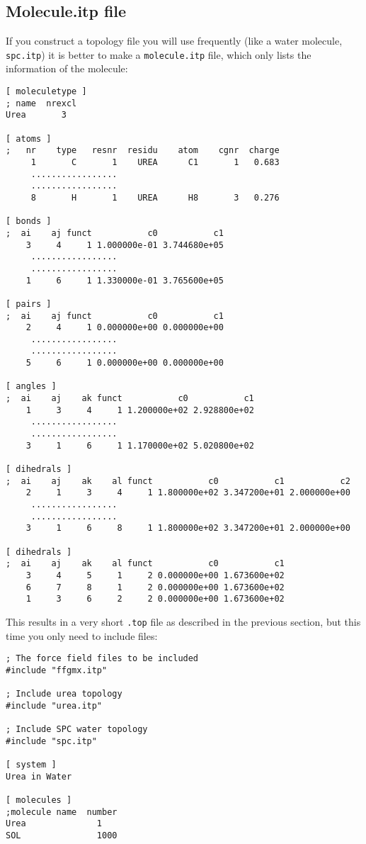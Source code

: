 \subsection{Molecule.itp file}
\label{subsec:molitp}
If you construct a topology file you will use frequently (like a water
molecule, {\tt spc.itp}) it is better to make a {\tt molecule.itp}
file, which only lists the information of the molecule: 
{\small\begin{verbatim}
[ moleculetype ]
; name  nrexcl
Urea       3

[ atoms ]
;   nr    type   resnr  residu    atom    cgnr  charge
     1       C       1    UREA      C1       1   0.683  
     .................
     .................
     8       H       1    UREA      H8       3   0.276

[ bonds ]
;  ai    aj funct           c0           c1
    3     4     1 1.000000e-01 3.744680e+05 
     .................
     .................
    1     6     1 1.330000e-01 3.765600e+05 

[ pairs ]
;  ai    aj funct           c0           c1
    2     4     1 0.000000e+00 0.000000e+00 
     .................
     .................
    5     6     1 0.000000e+00 0.000000e+00 

[ angles ]
;  ai    aj    ak funct           c0           c1
    1     3     4     1 1.200000e+02 2.928800e+02 
     .................
     .................
    3     1     6     1 1.170000e+02 5.020800e+02 

[ dihedrals ]
;  ai    aj    ak    al funct           c0           c1           c2
    2     1     3     4     1 1.800000e+02 3.347200e+01 2.000000e+00 
     .................
     .................
    3     1     6     8     1 1.800000e+02 3.347200e+01 2.000000e+00 

[ dihedrals ]
;  ai    aj    ak    al funct           c0           c1
    3     4     5     1     2 0.000000e+00 1.673600e+02 
    6     7     8     1     2 0.000000e+00 1.673600e+02 
    1     3     6     2     2 0.000000e+00 1.673600e+02 
\end{verbatim}
}
This results in a very short {\tt *.top} file as described in the
previous section, but this time you only need to include files:
{\small\begin{verbatim}
; The force field files to be included
#include "ffgmx.itp"
        
; Include urea topology
#include "urea.itp"

; Include SPC water topology
#include "spc.itp"

[ system ]
Urea in Water

[ molecules ]
;molecule name  number
Urea              1
SOL               1000
\end{verbatim}}

